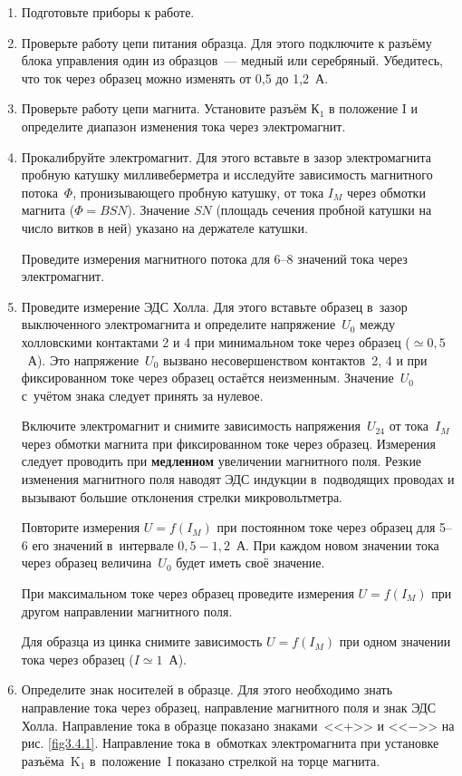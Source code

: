 \begin{enumerate}

\item{Подготовьте приборы к работе.}

\item{ Проверьте работу цепи питания образца. Для этого подключите к разъёму блока управления один из образцов~--- медный или серебряный. Убедитесь, что ток через образец можно изменять от 0,5 до 1,2~А.}
\item{ Проверьте работу цепи магнита. Установите разъём К$_1$ в положение I и определите диапазон изменения тока через электромагнит.}
\item{ Прокалибруйте электромагнит. Для этого вставьте в зазор электромагнита пробную катушку милливеберметра и исследуйте зависимость магнитного потока~$\Phi$, пронизывающего пробную катушку, от тока $I_M$ через обмотки магнита ($\Phi=BSN$).
Значение $SN$ (площадь сечения пробной катушки на число витков в ней) указано на держателе катушки.

Проведите измерения магнитного потока для 6--8 значений тока через электромагнит.}

\item{ Проведите измерение ЭДС Холла. Для этого вставьте образец в~зазор выключенного электромагнита и определите напряжение~$U_0$ между холловскими контактами 2 и 4 при минимальном токе через образец ($\simeq 0,5$~А). Это напряжение~$U_0$ вызвано несовершенством контактов~2, 4 и при фиксированном токе через образец остаётся неизменным. Значение~$U_0$ с~учётом знака следует принять за нулевое.

Включите электромагнит и снимите зависимость напряжения~$U_{24}$ от тока~$I_M$ через обмотки магнита при фиксированном токе через образец. Измерения следует проводить при {\bf медленном} увеличении магнитного поля. Резкие изменения магнитного поля наводят ЭДС индукции в~подводящих проводах и вызывают большие отклонения стрелки микровольтметра.

Повторите измерения $U=f(I_{M})$ при постоянном токе через образец для 5--6 его значений в~интервале $0,5-1,2$~А. При каждом новом значении тока через образец величина~$U_0$ будет иметь своё значение.

При максимальном токе через образец проведите измерения $U=f(I_{M})$ при другом направлении магнитного поля.

Для образца из цинка снимите зависимость $U=f(I_{M})$ при одном значении тока через образец ($I\simeq 1$~А).}

\item{Определите знак носителей в образце. Для этого необходимо знать направление тока через образец, направление магнитного поля и знак ЭДС Холла. Направление тока в образце показано знаками~<<+>> и <<$-$>> на рис. \ref{fig3.4.1}. Направление тока в~обмотках электромагнита при установке разъёма~K$_1$ в~положение~I показано стрелкой на торце магнита.

}
\end{enumerate}

